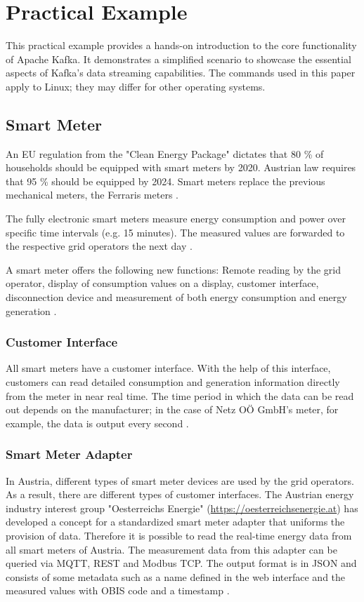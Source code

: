 \section{Practical Example}
\label{cha:practical}

This practical example provides a hands-on introduction to the core functionality of Apache Kafka. It demonstrates a simplified scenario to showcase the essential aspects of Kafka's data streaming capabilities. The commands used in this paper apply to Linux; they may differ for other operating systems.

\subsection{Smart Meter}

An EU regulation from the "Clean Energy Package" dictates that 80 \% of households should be equipped with smart meters by 2020. Austrian law requires that 95 \% should be equipped by 2024. Smart meters replace the previous mechanical meters, the Ferraris meters \cite{smartMeterOE}.

The fully electronic smart meters measure energy consumption and power over specific time intervals (e.g. 15 minutes). The measured values are forwarded to the respective grid operators the next day \cite{smartMeterOE}.

A smart meter offers the following new functions: Remote reading by the grid operator, display of consumption values on a display, customer interface, disconnection device and measurement of both energy consumption and energy generation \cite{smartMeterOE}.

\subsubsection{Customer Interface}
All smart meters have a customer interface. With the help of this interface, customers can read detailed consumption and generation information directly from the meter in near real time. The time period in which the data can be read out depends on the manufacturer; in the case of Netz OÖ GmbH's meter, for example, the data is output every second \cite{kernitzkyimehrwert}.

\subsubsection{Smart Meter Adapter}
In Austria, different types of smart meter devices are used by the grid operators. As a result, there are different types of customer interfaces. The Austrian energy industry interest group "Oesterreichs Energie" (\url{https://oesterreichsenergie.at}) has developed a concept for a standardized smart meter adapter that uniforms the provision of data. Therefore it is possible to read the real-time energy data from all smart meters of Austria. The measurement data from this adapter can be queried via MQTT, REST and Modbus TCP. The output format is in JSON and consists of some metadata such as a name defined in the web interface and the measured values with OBIS code and a timestamp \cite{smartMeterAdapter}.

